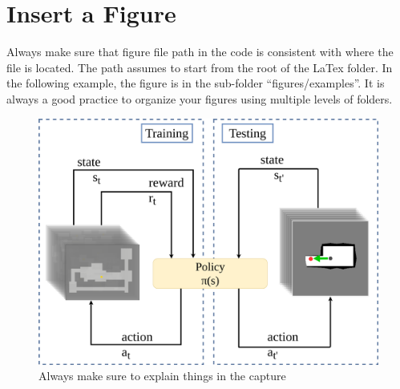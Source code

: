 




\section{Insert a Figure}
\label{sec::ch3::problem-def}
Always make sure that figure file path in the code is consistent with where the file is located. The path assumes to start from the root of the LaTex folder. In the following example, the figure is in the sub-folder ``figures/examples''. It is always a good practice to organize your figures using multiple levels of folders.
\begin{figure}[!h]
\centering%
\includegraphics[width=0.49\columnwidth]{figures/examples/environments.png}
\caption{Always make sure to explain things in the capture}
\label{fig::ch3::environments}
\end{figure}

\lipsum[11-12]
\clearpage